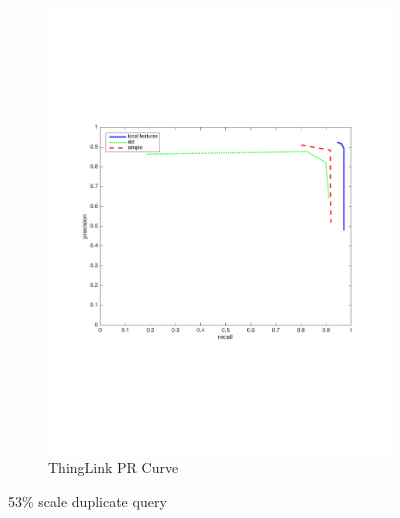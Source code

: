 \documentclass[english,12pt,a4paper,pdftex,elec,utf8, table]{aaltothesis}
\begin{document}
\begin{figure}[htb]
\begin{center}
\begin{subfigure}[b]{0.49\textwidth}
    \includegraphics[width=\textwidth]{figures/thinglink_53scalePR.pdf}
    \caption{ThingLink PR Curve}
    \label{53prthinglink}
  \end{subfigure}
  \caption{53\% scale duplicate query}
  \end{center}
\end{figure}
\end{document}
